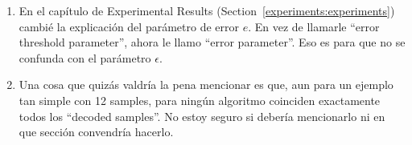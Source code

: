 \begin{enumerate}
\item En el capítulo de Experimental Results (Section~\ref{experiments:experiments}) cambié la explicación del parámetro de error $e$. En vez de llamarle ``error threshold parameter'', ahora le llamo ``error parameter''. Eso es para que no se confunda con el parámetro $\epsilon$.

\item Una cosa que quizás valdría la pena mencionar es que, aun para un ejemplo tan simple con 12 samples, para ningún algoritmo coinciden exactamente todos los ``decoded samples''. No estoy seguro si debería mencionarlo ni en que sección convendría hacerlo.



\end{enumerate}